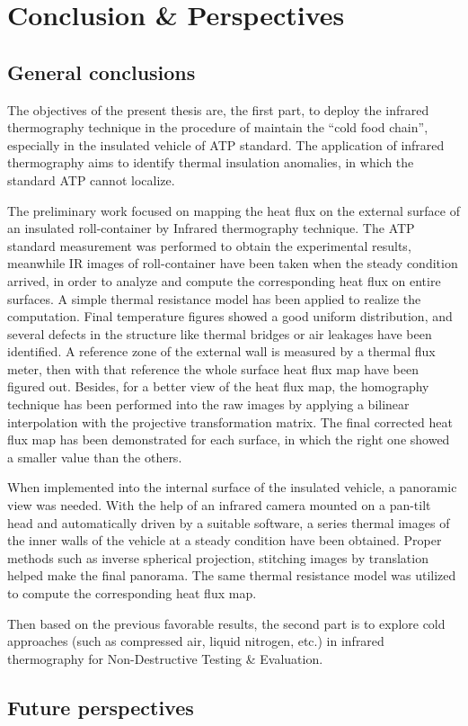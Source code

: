 \chapter*{Conclusion \& Perspectives}         %

\section{General conclusions}
The objectives of the present thesis are, the first part, to deploy the infrared thermography technique in the procedure of maintain the ``cold food chain'', especially in the insulated vehicle of ATP standard. The application of infrared thermography aims to identify thermal insulation anomalies, in which the standard ATP cannot localize. 

The preliminary work focused on mapping the heat flux on the external surface of an insulated roll-container by Infrared thermography technique. The ATP standard measurement was performed to obtain the experimental results, meanwhile IR images of roll-container have been taken when the steady condition arrived, in order to analyze and compute the corresponding heat flux on entire surfaces. A simple thermal resistance model has been applied to realize the computation. Final temperature figures showed a good uniform distribution, and several defects in the structure like thermal bridges or air leakages have been identified. A reference zone of the external wall is measured by a thermal flux meter, then with that reference the whole surface heat flux map have been figured out. Besides, for a better view of the heat flux map, the homography technique has been performed into the raw images by applying a bilinear interpolation with the projective transformation matrix. The final corrected heat flux map has been demonstrated for each surface, in which the right one showed a smaller value than the others.

When implemented into the internal surface of the insulated vehicle, a panoramic view was needed. With the help of an infrared camera mounted on a pan-tilt head and automatically driven by a suitable software, a series thermal images of the inner walls of the vehicle at a steady condition have been obtained. Proper methods such as inverse spherical projection, stitching images by translation helped make the final panorama. The same thermal resistance model was utilized to compute the corresponding heat flux map. 

Then based on the previous favorable results, the second part is to explore cold approaches (such as compressed air, liquid nitrogen, etc.) in infrared thermography for Non-Destructive Testing \& Evaluation. 



\section{Future perspectives}
